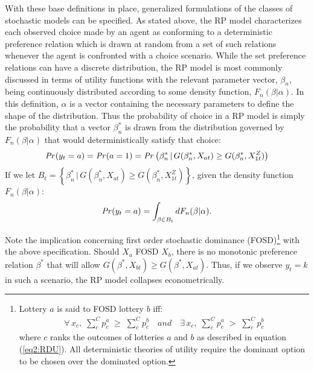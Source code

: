 \documentclass[../main.tex]{subfiles}
\begin{document}
With these base definitions in place, generalized formulations of the classes of stochastic models can be specified.
As stated above, the RP model characterizes each observed choice made by an agent as conforming to a deterministic preference relation which is drawn at random from a set of such relations whenever the agent is confronted with a choice scenario.
While the set preference relations can have a discrete distribution, the RP model is most commonly discussed in terms of utility functions with the relevant parameter vector, $\beta_n$, being continuously distributed according to some density function, $F_n(\beta | \alpha)$.
In this definition, $\alpha$ is a vector containing the necessary parameters to define the shape of the distribution.
Thus the probability of choice in a RP model is simply the probability that a vector $\beta_n^*$ is drawn from the distribution governed by $F_n(\beta | \alpha)$ that would deterministically satisfy that choice:
\begin{equation}
	\label{eq2:RP0}
	{\ensuremath{\mathit{Pr}}}(y_t=a) = {\mathit{Pr}}(a=1) = {\mathit{Pr}}\left( \beta_n^* \,|\, G(\beta_n^*,X_{at}) \geq G(\beta_n^*,X_{1t}^Z)\right)
\end{equation}
\noindent If we let $ B_t = \left\{ \beta_n^* \,|\, G(\beta_n^*,X_{at}) \geq G(\beta_n^*,X_{1t}^Z)\right\}$, given the density function $F_n(\beta | \alpha)$:
\begin{equation}
	\label{eq2:RP.f}
	{\ensuremath{\mathit{Pr}}}(y_t=a) = \int_{\beta \in B_t} dF_n(\beta|\alpha).
\end{equation}

Note the implication concerning first order stochastic dominance (FOSD)\footnote{
	Lottery $a$ is said to FOSD lottery $b$ iff:
	\begin{align*}
		\forall \, x_c , \; \sum_c^C p_c^a \; \geq \; \sum_c^C p_c^b \quad \textit{and} \quad \exists \, x_c , \; \sum_c^C p_c^a \; > \; \sum_c^C p_c^b
	\end{align*}
	where $c$ ranks the outcomes of lotteries $a$ and $b$ as described in equation (\ref{eq2:RDU}).
	All deterministic theories of utility require the dominant option to be chosen over the dominated option.} with the above specification. Should $X_a$ FOSD $X_b$, there is no monotonic preference relation $\beta^*$ that will allow $G(\beta^*,X_{bt}) \geq G(\beta^*,X_{at})$.
Thus, if we observe $y_t = k$ in such a scenario, the RP model collapses econometrically.
\end{document}
